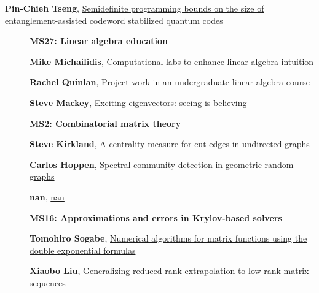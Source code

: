 \documentclass[ILAS2025-program.tex]{subfiles}
\begin{document}
\begin{description}
\begin{description}
{}
        \item[\info{11:30\textrm{--}12:00}] \hypertarget{up0288}{}\textbf{Pin-Chieh Tseng}, \hyperlink{down0288}{Semidefinite programming bounds on the size of entanglement-assisted codeword stabilized quantum codes
}
        \end{description}
    \begin{description}
    \item[] {\color{mstitle}\textbf{MS27: Linear algebra education}} 
    \item[] \hypertarget{up0292}{}\textbf{Mike Michailidis}, \hyperlink{down0292}{Computational labs to enhance linear algebra intuition}
        \item[] \hypertarget{up0293}{}\textbf{Rachel Quinlan}, \hyperlink{down0293}{Project work in an undergraduate linear algebra course}
        \item[] \hypertarget{up0294}{}\textbf{Steve Mackey}, \hyperlink{down0294}{Exciting eigenvectors: seeing is believing}
        \end{description}
    \begin{description}
    \item[] {\color{mstitle}\textbf{MS2: Combinatorial matrix theory}} 
    \item[] \hypertarget{up0295}{}\textbf{Steve Kirkland}, \hyperlink{down0295}{A centrality measure for cut edges in undirected graphs
}
        \item[] \hypertarget{up0296}{}\textbf{Carlos Hoppen}, \hyperlink{down0296}{Spectral community detection in geometric random graphs}
        \item[] \hypertarget{up0297}{}\textbf{nan}, \hyperlink{down0297}{nan}
        \end{description}
    \begin{description}
    \item[] {\color{mstitle}\textbf{MS16: Approximations and errors in Krylov-based solvers}} 
    \item[] \hypertarget{up0301}{}\textbf{Tomohiro Sogabe}, \hyperlink{down0301}{Numerical algorithms for matrix functions using the double exponential formulas
}
        \item[] \hypertarget{up0302}{}\textbf{Xiaobo Liu}, \hyperlink{down0302}{Generalizing reduced rank extrapolation to low-rank matrix sequences
}
\end{description}
\end{description}
\end{document}
